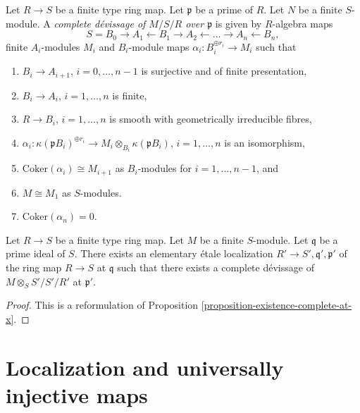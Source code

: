 \begin{definition}
\label{definition-complete-devissage-algebra}
Let $R \to S$ be a finite type ring map.
Let $\mathfrak p$ be a prime of $R$.
Let $N$ be a finite $S$-module.
A {\it complete d\'evissage of $M/S/R$ over $\mathfrak p$}
is given by $R$-algebra maps
$$
S = B_0 \to A_1 \leftarrow B_1 \to A_2 \leftarrow \ldots \to
A_n \leftarrow B_n,
$$
finite $A_i$-modules $M_i$ and $B_i$-module maps
$\alpha_i : B_i^{\oplus r_i} \to M_i$ such that
\begin{enumerate}
\item $B_i \to A_{i + 1}$, $i = 0, \ldots, n - 1$
is surjective and of finite presentation,
\item $B_i \to A_i$, $i = 1, \ldots, n$ is finite,
\item $R \to B_i$, $i = 1, \ldots, n$
is smooth with geometrically irreducible fibres,
\item $\alpha_i : \kappa(\mathfrak pB_i)^{\oplus r_i}
\to M_i \otimes_{B_i} \kappa(\mathfrak pB_i)$, $i = 1, \ldots, n$
is an isomorphism,
\item $\text{Coker}(\alpha_i) \cong M_{i + 1}$ as $B_i$-modules for
$i = 1, \ldots, n - 1$, and
\item $M \cong M_1$ as $S$-modules.
\item $\text{Coker}(\alpha_n) = 0$.
\end{enumerate}
\end{definition}

\begin{lemma}
\label{lemma-existence-algebra}
Let $R \to S$ be a finite type ring map.
Let $M$ be a finite $S$-module.
Let $\mathfrak q$ be a prime ideal of $S$.
There exists an elementary \'etale localization
$R' \to S', \mathfrak q', \mathfrak p'$ of
the ring map $R \to S$ at $\mathfrak q$ such that
there exists a complete d\'evissage of
$M \otimes_S S'/S'/R'$ at $\mathfrak p'$.
\end{lemma}

\begin{proof}
This is a reformulation of
Proposition \ref{proposition-existence-complete-at-x}.
\end{proof}




\section{Localization and universally injective maps}
\label{section-localize-universally-injective}


